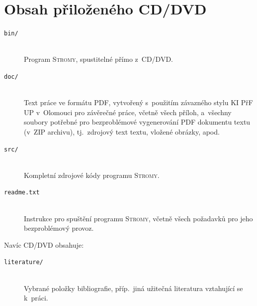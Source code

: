 \documentclass[
  biblatex=false,
  font=serif,
  glossaries=false,
  tables=false,
  theorems=false,
  index
]{kidiplom}
\begin{document}

\section{Obsah přiloženého CD/DVD} \label{sec:ObsahCD}

\begin{description}

\item[\texttt{bin/}] \hfill \\
  Program \textsc{Stromy}, spustitelné přímo z~CD/DVD. 

\item[\texttt{doc/}] \hfill \\
  Text práce ve formátu PDF, vytvořený s~použitím závazného stylu KI
  PřF UP v~Olomouci pro závěrečné práce, včetně všech příloh,
  a~všechny soubory potřebné pro bezproblémové vygenerování PDF
  dokumentu textu (v~ZIP archivu), tj.~zdrojový text textu, vložené
  obrázky, apod.

\item[\texttt{src/}] \hfill \\
  Kompletní zdrojové kódy programu \textsc{Stromy}.

\item[\texttt{readme.txt}] \hfill \\
  Instrukce pro spuštění programu \textsc{Stromy}, včetně
  všech požadavků pro jeho bezproblémový provoz.

\end{description}

Navíc CD/DVD obsahuje:

\begin{description}
\item[\texttt{literature/}] \hfill \\
  Vybrané položky bibliografie, příp.~jiná užitečná literatura
  vztahující se k~práci.
\end{description}




\end{document}
